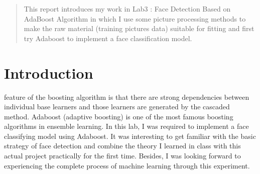 \documentclass[journal, a4paper]{IEEEtran}
\begin{document}
\begin{abstract}
This report introduces my work in Lab3 : Face Detection Based on AdaBoost Algorithm in which I use some picture processing methods to make the raw material (training pictures data) suitable for fitting and first try Adaboost to implement a face classification model.
\end{abstract}

\section{Introduction}
 feature of the boosting algorithm is that there are strong dependencies between individual base learners and those learners are generated by the cascaded method. Adaboost (adaptive boosting) is one of the most famous boosting algorithms in ensemble learning. In this lab, I was required to implement a face classifying model using Adaboost. It was interesting to get familiar with the basic strategy of face detection and combine the theory I learned in class with this actual project practically for the first time. Besides, I was looking forward to experiencing the complete process of machine learning through this experiment.

\end{document}
